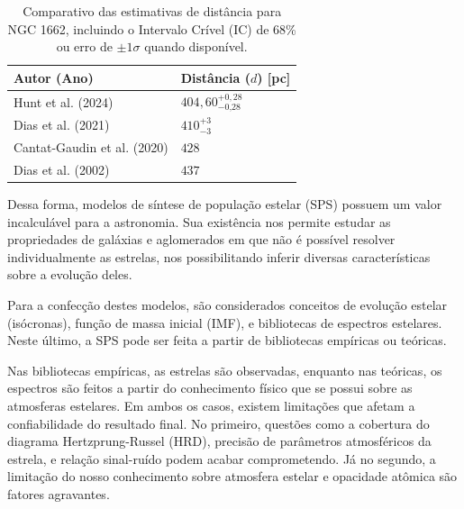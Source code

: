 \documentclass[12pt]{projeto}
\begin{document}
\begin{table}[h]
    \centering
    \caption{Comparativo das estimativas de distância para NGC 1662, incluindo o Intervalo Crível (IC) de 68\% ou erro de $\pm1\sigma$ quando disponível.}
    \label{tab:comparativo_distancias_incerteza}
    \renewcommand{\arraystretch}{1.3} %
    \begin{tabular}{|>{\centering}m{5cm}|>{\centering\arraybackslash}m{4cm}|}
        \hline
        \textbf{Autor (Ano)} & \textbf{Distância ($d$) [pc]} \\
        \hline
        Hunt et al. (2024) & $404,60^{+0,28}_{-\text{0,28}}$ \\
        \hline
        Dias et al. (2021) &  $410^{+3}_{-\text{3}}$ \\
        \hline
        Cantat-Gaudin et al. (2020) & $428$ \\
        \hline
        Dias et al. (2002) & $437$ \\
        \hline
    \end{tabular}
    \renewcommand{\arraystretch}{1.0} %
\end{table}

Dessa forma, modelos de síntese de população estelar (SPS) possuem um valor incalculável para a astronomia. Sua existência nos permite estudar as propriedades de galáxias e aglomerados em que não é possível resolver individualmente as estrelas, nos possibilitando inferir diversas características sobre a evolução deles. \cite{BC03}

Para a confecção destes modelos, são considerados conceitos de evolução estelar (isócronas), função de massa inicial (IMF), e bibliotecas de espectros estelares. Neste último, a SPS pode ser feita a partir de bibliotecas empíricas ou teóricas. \cite{Paula2020}

Nas bibliotecas empíricas, as estrelas são observadas, enquanto nas teóricas, os espectros são feitos a partir do conhecimento físico que se possui sobre as atmosferas estelares. Em ambos os casos, existem limitações que afetam a confiabilidade do resultado final. No primeiro, questões como a cobertura do diagrama Hertzprung-Russel (HRD), precisão de parâmetros atmosféricos da estrela, e relação sinal-ruído podem acabar comprometendo. Já no segundo, a limitação do nosso conhecimento sobre atmosfera estelar e opacidade atômica são fatores agravantes.
\end{document}
